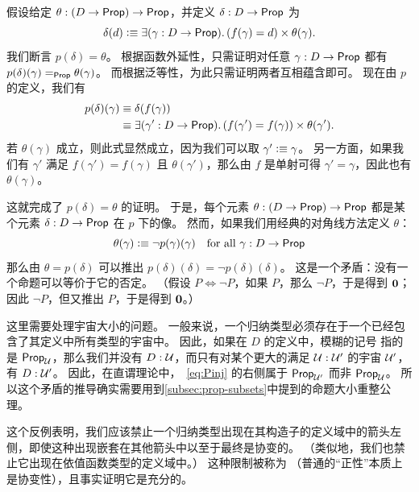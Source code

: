 假设给定 $\theta:(D\to\mathsf{Prop})\to\mathsf{Prop}$，并定义 $\delta:D\to\mathsf{Prop}$ 为
\begin{equation}
  \delta(d) \defeq \exis{\gamma:D\to\prop} (f(\gamma) = d) \times \theta(\gamma).\label{eq:Pinj}
\end{equation}
我们断言 $p(\delta)=\theta$。
根据函数外延性，只需证明对任意 $\gamma:D\to\mathsf{Prop}$ 都有 $p(\delta)(\gamma) =_{\mathsf{Prop}} \theta(\gamma)$。
而根据泛等性，为此只需证明两者互相蕴含即可。
现在由 $p$ 的定义，我们有
\begin{align*}
  p(\delta)(\gamma) &\jdeq \delta(f(\gamma))\\
  &\jdeq \exis{\gamma':D\to\prop} (f(\gamma') = f(\gamma)) \times \theta(\gamma').
\end{align*}
若 $\theta(\gamma)$ 成立，则此式显然成立，因为我们可以取 $\gamma'\vcentcolon\equiv \gamma$。
另一方面，如果我们有 $\gamma'$ 满足 $f(\gamma') = f(\gamma)$ 且 $\theta(\gamma')$，那么由 $f$ 是单射可得 $\gamma'=\gamma$，因此也有 $\theta(\gamma)$。

这就完成了 $p(\delta)=\theta$ 的证明。
于是，每个元素 $\theta:(D\to\mathsf{Prop})\to\mathsf{Prop}$ 都是某个元素 $\delta:D\to\mathsf{Prop}$ 在 $p$ 下的像。
然而，如果我们用经典的对角线方法定义 $\theta$：
\[ \theta(\gamma) \vcentcolon\equiv \neg p(\gamma)(\gamma) \quad\text{for all $\gamma:D\to\mathsf{Prop}$} \]
那么由 $\theta = p(\delta)$ 可以推出 $p(\delta)(\delta) = \neg p(\delta)(\delta)$。
这是一个矛盾：没有一个命题可以等价于它的否定。
（假设 $P\Leftrightarrow \neg P$，如果 $P$，那么 $\neg P$，于是得到 $\mathbf{0}$；因此 $\neg P$，但又推出 $P$，于是得到 $\mathbf{0}$。）

\begin{rmk}
  这里需要处理宇宙大小的问题。
  一般来说，一个归纳类型必须存在于一个已经包含了其定义中所有类型的宇宙中。
  因此，如果在 $D$ 的定义中，模糊的记号 \prop 指的是 $\mathsf{Prop}_{\mathcal{U}}$，那么我们并没有 $D:\mathcal{U}$，而只有对某个更大的满足 $\mathcal{U}:\mathcal{U}'$ 的宇宙 $\mathcal{U}'$，有 $D:\mathcal{U}'$。
  因此，在直谓理论中，~\eqref{eq:Pinj} 的右侧属于 $\mathsf{Prop}_{\mathcal{U}'}$ 而非 $\mathsf{Prop}_{\mathcal{U}}$。
  所以这个矛盾的推导确实需要用到\cref{subsec:prop-subsets}中提到的命题大小重整公理。
\end{rmk}

%
这个反例表明，我们应该禁止一个归纳类型出现在其构造子的定义域中的箭头左侧，即使这种出现嵌套在其他箭头中以至于最终是协变的。
（类似地，我们也禁止它出现在依值函数类型的定义域中。）
这种限制被称为
%
%
（普通的“正性”本质上是协变性），且事实证明它是充分的。

